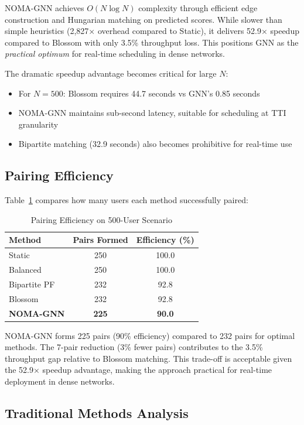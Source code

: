 NOMA-GNN achieves $O(N \log N)$ complexity through efficient edge construction and Hungarian matching on predicted scores. While slower than simple heuristics (2,827× overhead compared to Static), it delivers 52.9× speedup compared to Blossom with only 3.5\% throughput loss. This positions GNN as the \emph{practical optimum} for real-time scheduling in dense networks.

The dramatic speedup advantage becomes critical for large $N$:
\begin{itemize}
    \item For $N=500$: Blossom requires 44.7 seconds vs GNN's 0.85 seconds
    \item NOMA-GNN maintains sub-second latency, suitable for scheduling at TTI granularity
    \item Bipartite matching (32.9 seconds) also becomes prohibitive for real-time use
\end{itemize}

\subsection{Pairing Efficiency}

Table~\ref{tab:pairing_efficiency} compares how many users each method successfully paired:

\begin{table}[h]
\centering
\caption{Pairing Efficiency on 500-User Scenario}
\label{tab:pairing_efficiency}
\begin{tabular}{lcc}
\toprule
\textbf{Method} & \textbf{Pairs Formed} & \textbf{Efficiency (\%)} \\
\midrule
Static & 250 & 100.0 \\
Balanced & 250 & 100.0 \\
Bipartite PF & 232 & 92.8 \\
Blossom & 232 & 92.8 \\
\textbf{NOMA-GNN} & \textbf{225} & \textbf{90.0} \\
\bottomrule
\end{tabular}
\end{table}

NOMA-GNN forms 225 pairs (90\% efficiency) compared to 232 pairs for optimal methods. The 7-pair reduction (3\% fewer pairs) contributes to the 3.5\% throughput gap relative to Blossom matching. This trade-off is acceptable given the 52.9× speedup advantage, making the approach practical for real-time deployment in dense networks.

\subsection{Traditional Methods Analysis}

